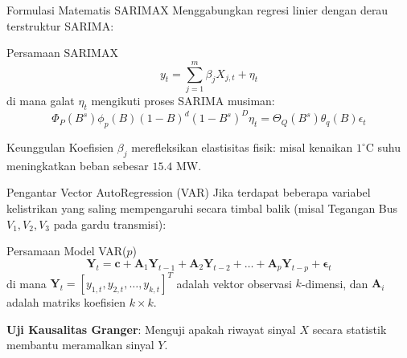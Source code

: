 \documentclass[aspectratio=169, 10pt]{beamer}
\begin{document}
\begin{frame}{Formulasi Matematis SARIMAX}
    Menggabungkan regresi linier dengan derau terstruktur SARIMA:
    \begin{block}{Persamaan SARIMAX}
        \begin{equation}
            y_t = \sum_{j=1}^m \beta_j X_{j,t} + \eta_t
        \end{equation}
        di mana galat $\eta_t$ mengikuti proses SARIMA musiman:
        \begin{equation}
            \Phi_P(B^s)\phi_p(B)(1 - B)^d(1 - B^s)^D \eta_t = \Theta_Q(B^s)\theta_q(B)\epsilon_t
        \end{equation}
    \end{block}
    \begin{alertblock}{Keunggulan}
        Koefisien $\beta_j$ merefleksikan elastisitas fisik: misal kenaikan $1^\circ\text{C}$ suhu meningkatkan beban sebesar $15.4$ MW.
    \end{alertblock}
\end{frame}

\begin{frame}{Pengantar Vector AutoRegression (VAR)}
    Jika terdapat beberapa variabel kelistrikan yang saling mempengaruhi secara timbal balik (misal Tegangan Bus $V_1, V_2, V_3$ pada gardu transmisi):
    \begin{block}{Persamaan Model VAR($p$)}
        \begin{equation}
            \mathbf{Y}_t = \mathbf{c} + \mathbf{A}_1 \mathbf{Y}_{t-1} + \mathbf{A}_2 \mathbf{Y}_{t-2} + \dots + \mathbf{A}_p \mathbf{Y}_{t-p} + \boldsymbol{\epsilon}_t
        \end{equation}
        di mana $\mathbf{Y}_t = [y_{1,t}, y_{2,t}, \dots, y_{k,t}]^T$ adalah vektor observasi $k$-dimensi, dan $\mathbf{A}_i$ adalah matriks koefisien $k \times k$.
    \end{block}
    \vspace{0.1cm}
    \begin{center}
        \textbf{Uji Kausalitas Granger}: Menguji apakah riwayat sinyal $X$ secara statistik membantu meramalkan sinyal $Y$.
    \end{center}
\end{frame}
\end{document}
